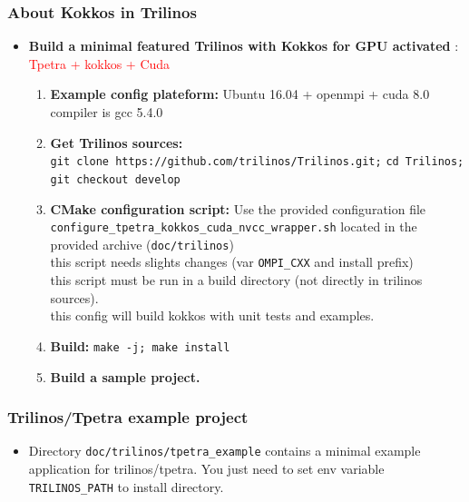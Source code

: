 \begin{frame}
  \frametitle{About Kokkos in Trilinos}

  \begin{itemize}
  \item \textbf{Build a minimal featured Trilinos with Kokkos for GPU activated} : \textcolor{red}{Tpetra + kokkos + Cuda}
    \begin{enumerate}
    \item \textbf{Example config plateform:} Ubuntu 16.04 + openmpi + cuda 8.0\\
      compiler is gcc 5.4.0
    \item \textbf{Get Trilinos sources:}\\
      \texttt{git clone https://github.com/trilinos/Trilinos.git;} \texttt{cd Trilinos; git checkout develop}
    \item \textbf{CMake configuration script:} Use the provided configuration file \texttt{configure\_tpetra\_kokkos\_cuda\_nvcc\_wrapper.sh} located in the provided archive (\texttt{doc/trilinos})\\
      this script needs slights changes (var \texttt{OMPI\_CXX} and install prefix)\\
      this script must be run in a build directory (not directly in trilinos sources).\\
      this config will build kokkos with unit tests and examples.
    \item \textbf{Build:} \texttt{make -j; make install}
    \item \textbf{Build a sample project.}
    \end{enumerate}
  \end{itemize}

\end{frame}

\begin{frame}
  \frametitle{Trilinos/Tpetra example project}

  \begin{itemize}
  \item Directory \texttt{doc/trilinos/tpetra\_example} contains a minimal example application for trilinos/tpetra. You just need to set env variable \texttt{TRILINOS\_PATH} to install directory.
  \end{itemize}
  
\end{frame}
